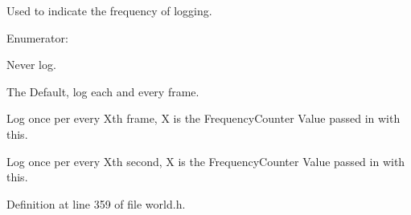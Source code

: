 Used to indicate the frequency of logging. 

\begin{Desc}
\item[Enumerator: ]\par
\begin{description}
\item[{\em 
\hypertarget{classMezzanine_1_1World_a535c832832bbdebcdc623c3472a32e25abf336536d5cf6396466067a847f64e3d}{
LogNever}
\label{classMezzanine_1_1World_a535c832832bbdebcdc623c3472a32e25abf336536d5cf6396466067a847f64e3d}
}]Never log. \item[{\em 
\hypertarget{classMezzanine_1_1World_a535c832832bbdebcdc623c3472a32e25ac1d6f9aa441fdc15961f28f18bbdbdb2}{
LogOncePerFrame}
\label{classMezzanine_1_1World_a535c832832bbdebcdc623c3472a32e25ac1d6f9aa441fdc15961f28f18bbdbdb2}
}]The Default, log each and every frame. \item[{\em 
\hypertarget{classMezzanine_1_1World_a535c832832bbdebcdc623c3472a32e25a1d4113b21efd91ab73056970906fafe5}{
LogOncePerXFrames}
\label{classMezzanine_1_1World_a535c832832bbdebcdc623c3472a32e25a1d4113b21efd91ab73056970906fafe5}
}]Log once per every Xth frame, X is the FrequencyCounter Value passed in with this. \item[{\em 
\hypertarget{classMezzanine_1_1World_a535c832832bbdebcdc623c3472a32e25adf1caf2c27e4c4e6178c13e8579ab872}{
LogOncePerXSeconds}
\label{classMezzanine_1_1World_a535c832832bbdebcdc623c3472a32e25adf1caf2c27e4c4e6178c13e8579ab872}
}]Log once per every Xth second, X is the FrequencyCounter Value passed in with this. \end{description}
\end{Desc}



Definition at line 359 of file world.h.



